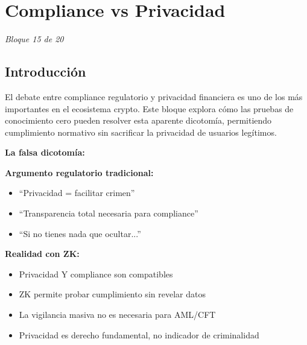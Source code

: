 \documentclass[11pt,a4paper,twoside]{book}
\theoremstyle{definition}
\theoremstyle{remark}
\renewcommand{\cleardoublepage}{\clearpage}
\begin{document}
\cleardoublepage


\chapter{Compliance vs Privacidad}
\label{ch:bloque15}

\begin{center}
\textit{Bloque 15 de 20}
\end{center}

\section*{Introducción}

El debate entre compliance regulatorio y privacidad financiera es uno de los más importantes en el ecosistema crypto. Este bloque explora cómo las pruebas de conocimiento cero pueden resolver esta aparente dicotomía, permitiendo cumplimiento normativo sin sacrificar la privacidad de usuarios legítimos.

\begin{keyidea}
\textbf{La falsa dicotomía:}

\textbf{Argumento regulatorio tradicional:}
\begin{itemize}
    \item ``Privacidad = facilitar crimen''
    \item ``Transparencia total necesaria para compliance''
    \item ``Si no tienes nada que ocultar...''
\end{itemize}

\textbf{Realidad con ZK:}
\begin{itemize}
    \item Privacidad Y compliance son compatibles
    \item ZK permite probar cumplimiento sin revelar datos
    \item La vigilancia masiva no es necesaria para AML/CFT
    \item Privacidad es derecho fundamental, no indicador de criminalidad
\end{itemize}
\end{keyidea}
\end{document}
